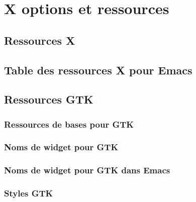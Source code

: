 \chapter{X options et ressources}\label{appD}
\section{Ressources X}\label{appDsec1}
\section{Table des ressources X pour Emacs}\label{appDsec2}
\section{Ressources GTK}\label{appDsec3}
\subsection{Ressources de bases pour GTK}\label{appDsec4}
\subsection{Noms de widget pour GTK}\label{appDsec5}
\subsection{Noms de widget pour GTK dans Emacs}\label{appDsec6}
\subsection{Styles GTK}\label{appDsec7}
